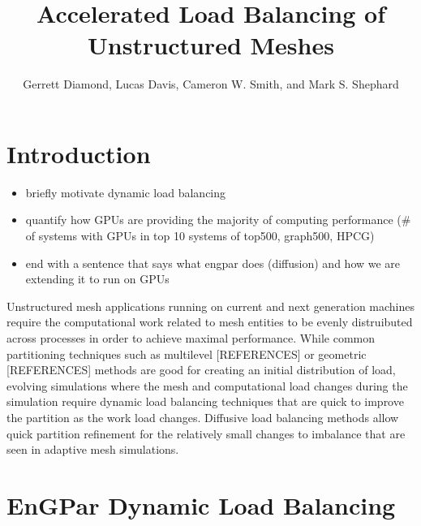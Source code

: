 \documentclass[graybox]{svmult}
\begin{document}
\title*{Accelerated Load Balancing of Unstructured Meshes}
\author{
Gerrett Diamond,
Lucas Davis,
Cameron W. Smith,
and Mark S. Shephard
}

\maketitle


\section{Introduction} \label{sec:intro}

\begin{itemize}
  \item briefly motivate dynamic load balancing
  \item quantify how GPUs are providing the majority of computing performance (\# of systems with GPUs in top 10 systems of top500, graph500, HPCG)
  \item end with a sentence that says what engpar does (diffusion) and how we are
extending it to run on GPUs
\end{itemize}

Unstructured mesh applications running on current and next generation machines require the
computational work related to mesh entities to be evenly distruibuted across processes in
order to achieve maximal performance. While common partitioning techniques such as multilevel
[REFERENCES] or geometric [REFERENCES] methods are good for creating an initial distribution
of load, evolving simulations where the mesh and computational load changes during the
simulation require dynamic load balancing techniques that are quick to improve the partition
as the work load changes. Diffusive load balancing methods allow quick partition refinement
for the relatively small changes to imbalance that are seen in adaptive mesh simulations.

\section{EnGPar Dynamic Load Balancing} \label{sec:engpar}
\end{document}
